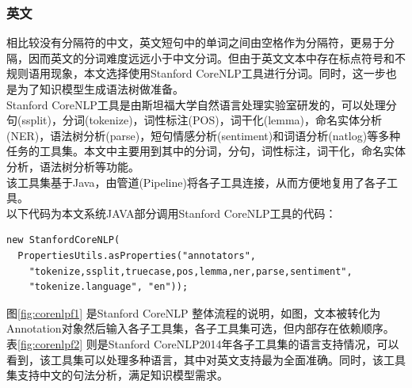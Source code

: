 \subsubsection{英文}
相比较没有分隔符的中文，英文短句中的单词之间由空格作为分隔符，更易于分隔，因而英文的分词难度远远小于中文分词。但由于英文文本中存在标点符号和不规则语用现象，本文选择使用Stanford CoreNLP工具进行分词。同时，这一步也是为了知识模型生成语法树做准备。\\
Stanford CoreNLP工具是由斯坦福大学自然语言处理实验室研发的\cite{corenlp}，可以处理分句(ssplit)，分词(tokenize)，词性标注(POS)，词干化(lemma)，命名实体分析(NER)，语法树分析(parse)，短句情感分析(sentiment)和词语分析(natlog)等多种任务的工具集。本文中主要用到其中的分词，分句，词性标注，词干化，命名实体分析，语法树分析等功能。\\
该工具集基于Java，由管道(Pipeline)将各子工具连接，从而方便地复用了各子工具。\\
以下代码为本文系统JAVA部分调用Stanford CoreNLP工具的代码：\\
\lstset{language=java}
\begin{lstlisting}
new StanfordCoreNLP(
  PropertiesUtils.asProperties("annotators",
    "tokenize,ssplit,truecase,pos,lemma,ner,parse,sentiment",
    "tokenize.language", "en"));
\end{lstlisting}

图\ref{fig:corenlpf1} \cite{corenlp} 是Stanford CoreNLP 整体流程的说明，如图，文本被转化为Annotation对象然后输入各子工具集，各子工具集可选，但内部存在依赖顺序。\\
表\ref{fig:corenlpf2} \cite{corenlp} 则是Stanford CoreNLP2014年各子工具集的语言支持情况，可以看到，该工具集可以处理多种语言，其中对英文支持最为全面准确。同时，该工具集支持中文的句法分析，满足知识模型需求。
\begin{center}
\begin{figure}
\end{figure}
\end{center}

